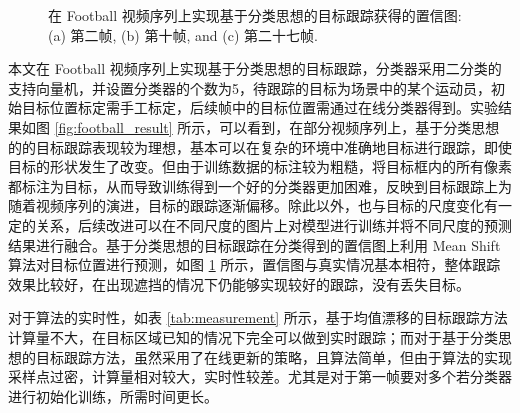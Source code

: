 \begin{figure}[!ht]
  \centering
  \begin{minipage}[b]{\linewidth} 

  \end{minipage}
  \vfill
  \caption{在 Football 视频序列上实现基于分类思想的目标跟踪获得的置信图: (a) 第二帧, (b) 第十帧, and (c) 第二十七帧.}
  \label{fig:confidence}
\end{figure}

本文在 Football 视频序列上实现基于分类思想的目标跟踪，分类器采用二分类的支持向量机，并设置分类器的个数为5，待跟踪的目标为场景中的某个运动员，初始目标位置标定需手工标定，后续帧中的目标位置需通过在线分类器得到。实验结果如图 \ref{fig:football_result} 所示，可以看到，在部分视频序列上，基于分类思想的的目标跟踪表现较为理想，基本可以在复杂的环境中准确地目标进行跟踪，即使目标的形状发生了改变。但由于训练数据的标注较为粗糙，将目标框内的所有像素都标注为目标，从而导致训练得到一个好的分类器更加困难，反映到目标跟踪上为随着视频序列的演进，目标的跟踪逐渐偏移。除此以外，也与目标的尺度变化有一定的关系，后续改进可以在不同尺度的图片上对模型进行训练并将不同尺度的预测结果进行融合。基于分类思想的目标跟踪在分类得到的置信图上利用 Mean Shift 算法对目标位置进行预测，如图 \ref{fig:confidence} 所示，置信图与真实情况基本相符，整体跟踪效果比较好，在出现遮挡的情况下仍能够实现较好的跟踪，没有丢失目标。


\begin{table}[!htbp]
\caption{不同跟踪方法的实时性比较}
\centering
\label{tab:measurement}
\end{table}

\newpage
对于算法的实时性，如表 \ref{tab:measurement} 所示，基于均值漂移的目标跟踪方法计算量不大，在目标区域已知的情况下完全可以做到实时跟踪；而对于基于分类思想的目标跟踪方法，虽然采用了在线更新的策略，且算法简单，但由于算法的实现采样点过密，计算量相对较大，实时性较差。尤其是对于第一帧要对多个若分类器进行初始化训练，所需时间更长。